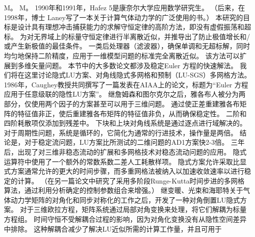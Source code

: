 \documentclass[UTF8,11pt,a4paper,openany,fontset=fandol]{ctexbook}
\begin{document}
M。 M。 1990年和1991年，Hafez 5是康奈尔大学应用数学研究生。 （后来，在1998年，博士 Laney写了一本关于计算气体动力学的广泛使用的书。） 本研究的目标是设计具有理想冲击捕获能力的求解守恒定律的高阶方法，即没有虚假振荡和超标。 为对无界域上的标量守恒定律进行半离散近似，并推导出了防止极值增长和/或产生新极值的最佳条件。 一类后处理器（滤波器），确保单调和无超标解，同时均匀地保持二阶精度，应用于一维模型问题的标准完全离散近似。 该方法可以扩展到多维矢量问题。 本节中的大多数论文都涉及稳定Euler 方程的快速解法。 我们将在这里讨论隐式LU方案、对角线隐式多网格和预制（LU-SGS）多网格方法。 1986年，Caughey教授共同撰写了一篇发表在AIAA上的论文，标题为“Euler 方程应用于任意级联的隐性LU方案”。 继詹姆森和图尔克尔之后，雅各布人被分为两部分，仅使用两个因子的方案甚至可以用于三维问题。 通过使正差重建雅各布矩阵的特征值非正，使后重建雅各布矩阵的特征值非负，从而确保稳定性。 二阶和四阶耗散项仅添加到残差中。 下块和上块对角线系统是通过逐点进行域解决的。 对于周期性问题，系统是循环的，它简化为通常的行进技术，操作量是两倍。 结论是，对于稳定流问题，LU方案比所测试的二维问题的AD1方案快2-3倍。 三年后，出现了对三维非稳态流动的扩展和多网格技术对稳态流动问题的应用。 隐式运算符中使用了一个额外的常数系数二差人工耗散样项。 隐式方案允许采取比显式方案通常允许的更大的时间步骤，而多重网格法被纳入以加速收敛速率以进行稳定的计算。 （在另一篇论文中研究了采用多阶段Runge-Kutta时间步进的多网格算法，通过利用分析确定的控制参数组合来增强。） 继变暖、光束和海耶特关于气体动力学矩阵的对角化和同步对称化的工作之后，开发了一种对角倒置LU隐式方案。 对于三维欧拉方程，矩阵系统通过局部对角变换来处理，将它们解耦为标量方程组。 时间守恒不受解耦合过程的影响，因为对角化变换没有从隐性空间差异中排除。 这种解耦合减少了解决LU近似所需的计算工作量，并且可用于
\end{document}
